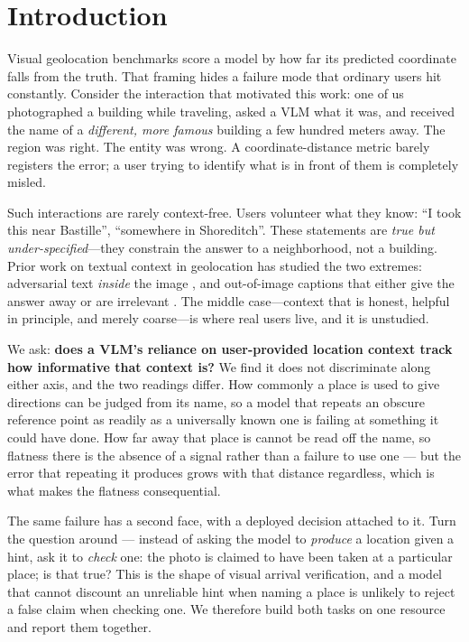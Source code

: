 \documentclass[10pt,a4paper]{article}
\begin{document}
\section{Introduction}

Visual geolocation benchmarks score a model by how far its predicted coordinate
falls from the truth. That framing hides a failure mode that ordinary users hit
constantly. Consider the interaction that motivated this work: one of us
photographed a building while traveling, asked a VLM what it was, and received
the name of a \emph{different, more famous} building a few hundred meters away.
The region was right. The entity was wrong. A coordinate-distance metric barely
registers the error; a user trying to identify what is in front of them is
completely misled.

Such interactions are rarely context-free. Users volunteer what they know: ``I
took this near Bastille'', ``somewhere in Shoreditch''. These statements are
\emph{true but under-specified}---they constrain the answer to a neighborhood,
not a building. Prior work on textual context in geolocation has studied the two
extremes: adversarial text \emph{inside} the image
\citep{signpost}, and out-of-image captions that either give the answer away or
are irrelevant \citep{koreageo}. The middle case---context that is honest,
helpful in principle, and merely coarse---is where real users live, and it is
unstudied.

We ask: \textbf{does a VLM's reliance on user-provided location context track
how informative that context is?} We find it does not discriminate along
either axis, and the two readings differ. How commonly a place is used to give
directions can be judged from its name, so a model that repeats an obscure
reference point as readily as a universally known one is failing at something
it could have done. How far away that place is cannot be read off the name, so
flatness there is the absence of a signal rather than a failure to use one ---
but the error that repeating it produces grows with that distance regardless,
which is what makes the flatness consequential.

The same failure has a second face, with a deployed decision attached to it.
Turn the question around --- instead of asking the model to \emph{produce} a
location given a hint, ask it to \emph{check} one: the photo is claimed to have
been taken at a particular place; is that true? This is the shape of visual
arrival verification, and a model that cannot discount an unreliable hint when
naming a place is unlikely to reject a false claim when checking one. We
therefore build both tasks on one resource and report them together.
\end{document}
